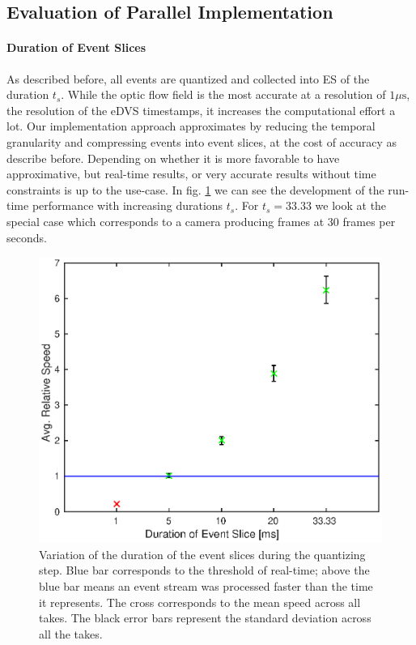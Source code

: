 \subsection{Evaluation of Parallel Implementation}
\paragraph{Duration of Event Slices}
As described before, all events are quantized and collected into ES of the duration $t_s$.
While the optic flow field is the most accurate at a resolution of $1\mu\mathrm{s}$, the resolution of the eDVS timestamps, it increases the computational effort a lot.
Our implementation approach approximates by reducing the temporal granularity and compressing events into event slices, at the cost of accuracy as describe before.
Depending on whether it is more favorable to have approximative, but real-time results, or very accurate results without time constraints is up to the use-case.
In fig. \ref{fig:gpu_tsd} we can see the development of the run-time performance with increasing durations $t_s$.
For $t_s=33.33$ we look at the special case which corresponds to a camera producing frames at 30 frames per seconds.
\begin{figure}[!htb]
	\centering
	\includegraphics[scale=.9]{gpu_tsd.eps}
	\caption[Variation of the duration of the event slices during the quantizing step]{Variation of the duration of the event slices during the quantizing step. Blue bar corresponds to the threshold of real-time; above the blue bar means an event stream was processed faster than the time it represents. The cross corresponds to the mean speed across all takes. The black error bars represent the standard deviation across all the takes.}
	\label{fig:gpu_tsd}
\end{figure}
